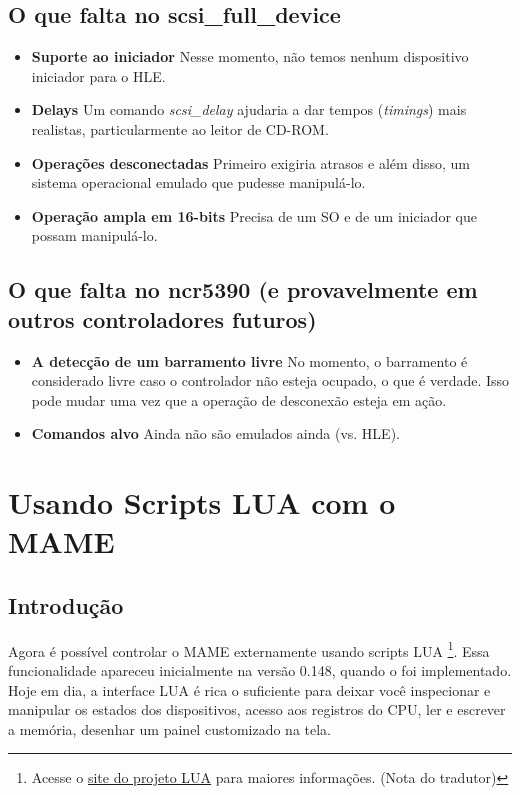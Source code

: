 \documentclass[letterpaper,10pt,brazil]{sphinxmanual}
\begin{document}
\subsection{O que falta no \textbf{scsi\_full\_device}}
\label{techspecs/nscsi:o-que-falta-no-scsi-full-device}\begin{itemize}
\item {} 
\textbf{Suporte ao iniciador} Nesse momento, não temos nenhum dispositivo
iniciador para o HLE.

\item {} 
\textbf{Delays} Um comando \emph{scsi\_delay} ajudaria a dar tempos (\emph{timings})
mais realistas, particularmente ao leitor de CD-ROM.

\item {} 
\textbf{Operações desconectadas} Primeiro exigiria atrasos e além disso,
um sistema operacional emulado que pudesse manipulá-lo.

\item {} 
\textbf{Operação ampla em 16-bits} Precisa de um SO e de um iniciador que
possam manipulá-lo.

\end{itemize}


\subsection{O que falta no ncr5390 (e provavelmente em outros controladores futuros)}
\label{techspecs/nscsi:o-que-falta-no-ncr5390-e-provavelmente-em-outros-controladores-futuros}\begin{itemize}
\item {} 
\textbf{A detecção de um barramento livre} No momento, o barramento é
considerado livre caso o controlador não esteja ocupado, o que é
verdade. Isso pode mudar uma vez que a operação de desconexão esteja
em ação.

\item {} 
\textbf{Comandos alvo} Ainda não são emulados ainda (vs. HLE).

\end{itemize}
\clearpage

\section{Usando Scripts LUA com o MAME}
\label{techspecs/luaengine:usando-scripts-lua-com-o-mame}\label{techspecs/luaengine::doc}

\subsection{Introdução}
\label{techspecs/luaengine:introducao}
Agora é possível controlar o MAME externamente usando scripts LUA \footnote[1]{\sphinxAtStartFootnote%
Acesse o \href{https://www.lua.org/portugues.html}{site do projeto LUA} para maiores informações.
(Nota do tradutor)
}.
Essa funcionalidade apareceu inicialmente na versão 0.148, quando o
 foi implementado. Hoje em dia, a interface LUA é rica o
suficiente para deixar você inspecionar e manipular os estados dos
dispositivos, acesso aos registros do CPU, ler e escrever a memória,
desenhar um painel customizado na tela.
\end{document}
